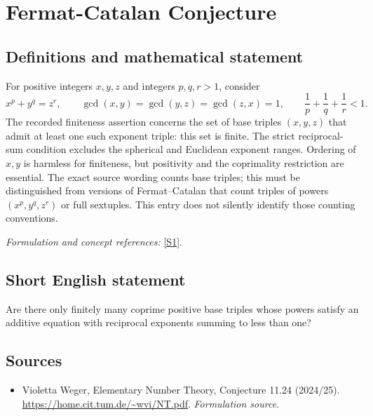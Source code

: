 \documentclass[11pt]{article}
\begin{document}
\section*{\texorpdfstring{Fermat-Catalan Conjecture}{Fermat-Catalan Conjecture}}\label{statement}
\subsection{Definitions and mathematical statement}
For positive integers $x,y,z$ and integers $p,q,r>1$, consider
\[
 x^p+y^q=z^r,\qquad
 \gcd(x,y)=\gcd(y,z)=\gcd(z,x)=1,
 \qquad\frac1p+\frac1q+\frac1r<1.
\]
The recorded finiteness assertion concerns the set of base triples $(x,y,z)$ that admit at least one such exponent triple: this set is finite. The strict reciprocal-sum condition excludes the spherical and Euclidean exponent ranges. Ordering of $x,y$ is harmless for finiteness, but positivity and the coprimality restriction are essential. The exact source wording counts base triples; this must be distinguished from versions of Fermat--Catalan that count triples of powers $(x^p,y^q,z^r)$ or full sextuples. This entry does not silently identify those counting conventions.
\par\smallskip\textit{Formulation and concept references:} \href{https://home.cit.tum.de/~wvi/NT.pdf}{[S1]}.

\subsection{Short English statement}
Are there only finitely many coprime positive base triples whose powers satisfy an additive equation with reciprocal exponents summing to less than one?
\subsection{Sources}
\begin{itemize}
\item[S1]Violetta Weger, Elementary Number Theory, Conjecture 11.24 (2024/25).
\url{https://home.cit.tum.de/~wvi/NT.pdf}.
\textit{Formulation source.}
\end{itemize}
\end{document}
